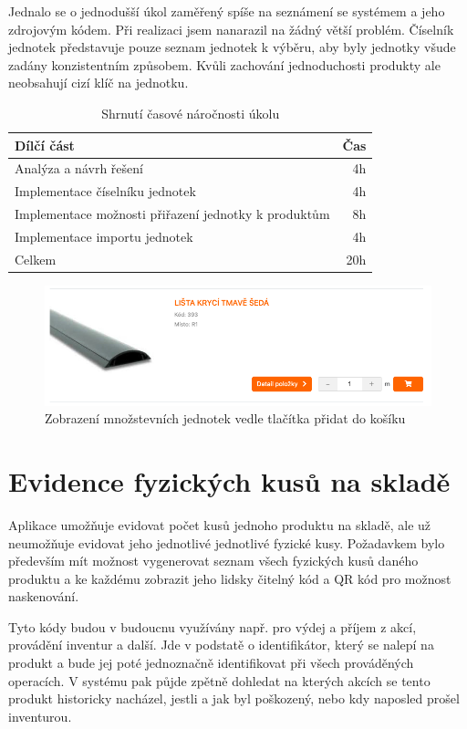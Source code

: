 Jednalo se o jednodušší úkol zaměřený spíše na seznámení se systémem a jeho zdrojovým kódem. Při realizaci jsem nanarazil na žádný větší problém. Číselník jednotek představuje pouze seznam jednotek k výběru, aby byly jednotky všude zadány konzistentním způsobem. Kvůli zachování jednoduchosti produkty ale neobsahují cizí klíč na jednotku.

\begin{table}
	\centering
	\caption[Časová náročnost úkolu na zavedení množstevních jednotek]{Shrnutí časové náročnosti úkolu}
	\label{tab:TopLevelTableLabel}
	{
		\begin{tabular}{lr}
			\toprule
			Dílčí část & Čas\\
			\midrule
			Analýza a návrh řešení & 4h \\
			Implementace číselníku jednotek & 4h \\
			Implementace možnosti přiřazení jednotky k produktům & 8h \\
			Implementace importu jednotek & 4h \\
            \midrule
            Celkem  & 20h \\
			\midrule
		\end{tabular}
	}
\end{table}

\begin{figure}
    \centering
    \includegraphics[width=0.7\linewidth]{Figures/mnozstevni-jednotky.png}
    \caption{Zobrazení množstevních jednotek vedle tlačítka přidat do košíku}
    \label{fig:enter-label}
\end{figure}

\section{Evidence fyzických kusů na skladě}

Aplikace umožňuje evidovat počet kusů jednoho produktu na skladě, ale už neumožňuje evidovat jeho jednotlivé jednotlivé fyzické kusy. Požadavkem bylo především mít možnost vygenerovat seznam všech fyzických kusů daného produktu a ke každému zobrazit jeho lidsky čitelný kód a QR kód pro možnost naskenování.

Tyto kódy budou v budoucnu využívány např. pro výdej a příjem z akcí, provádění inventur a další. Jde v podstatě o identifikátor, který se nalepí na produkt a bude jej poté jednoznačně identifikovat při všech prováděných operacích. V systému pak půjde zpětně dohledat na kterých akcích se tento produkt historicky nacházel, jestli a jak byl poškozený, nebo kdy naposled prošel inventurou.

